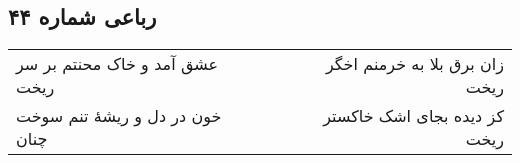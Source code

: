 \begin{center}
\section*{رباعی شماره ۴۴}
\label{sec:sh044}
\begin{longtable}{l p{0.5cm} r}
عشق آمد و خاک محنتم بر سر ریخت
&&
زان برق بلا به خرمنم اخگر ریخت
\\
خون در دل و ریشهٔ تنم سوخت چنان
&&
کز دیده بجای اشک خاکستر ریخت
\\
\end{longtable}
\end{center}
